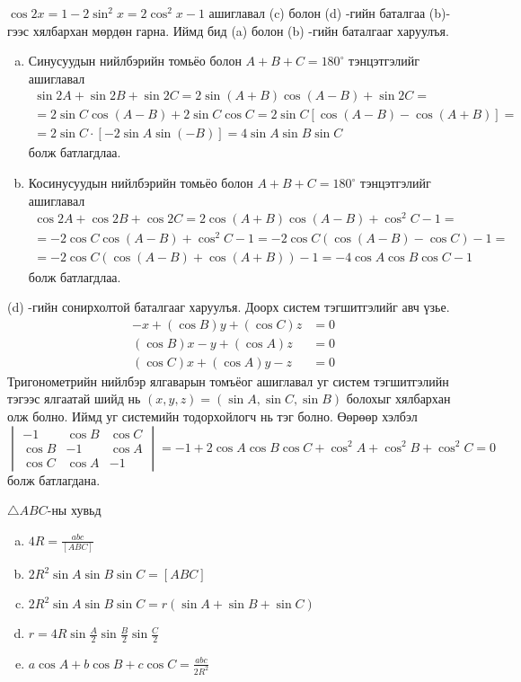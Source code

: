 \documentclass[10pt,a4paper,oneside]{book}
\begin{document}
\TheSolution
$\cos 2x = 1-2\sin^2 x = 2\cos^2 x - 1$ ашиглавал (c) болон  (d) -гийн баталгаа (b)-гээс хялбархан мөрдөн гарна. Иймд бид (a) болон (b) -гийн баталгааг харуулъя.
\begin{enumerate}[(a)]
\item
Синусуудын нийлбэрийн томьёо болон $A+B+C = 180^\circ$ тэнцэтгэлийг ашиглавал
\begin{align*}
\sin 2A + \sin 2B + \sin 2C = 2\sin (A+B)\cos(A-B) + \sin 2C = \\
= 2\sin C \cos(A-B) + 2\sin C \cos C = 2\sin C \left[\cos (A-B) - \cos (A+B)\right] = \\
= 2\sin C \cdot \left[-2\sin A \sin (-B)\right] = 4\sin A\sin B\sin C
\end{align*}
болж батлагдлаа.
\item
Косинусуудын нийлбэрийн томьёо болон $A+B+C = 180^\circ$  тэнцэтгэлийг ашиглавал
\begin{align*}
\cos 2A + \cos 2B + \cos 2C = 2\cos(A+B)\cos(A-B) + \cos^2 C -1 = \\
= -2\cos C \cos(A-B) + \cos^2 C - 1 = -2\cos C(\cos(A-B) - \cos C) - 1 =\\
= -2\cos C(\cos(A-B) + \cos(A+B)) - 1 = - 4\cos A \cos B\cos C -1
\end{align*}
болж батлагдлаа.
\end{enumerate}
\Note
(d) -гийн сонирхолтой баталгааг харуулъя. Доорх систем тэгшитгэлийг авч үзье.
\begin{align*}
-x + (\cos B)y +(\cos C)z &= 0\\
(\cos B)x -y + (\cos A)z &= 0\\
(\cos C) x + (\cos A) y - z &= 0
\end{align*}
Тригонометрийн нийлбэр ялгаварын томъёог ашиглавал уг систем тэгшитгэлийн тэгээс ялгаатай шийд нь $(x, y, z) = (\sin A, \sin C, \sin B)$ болохыг хялбархан олж болно. Иймд уг системийн тодорхойлогч нь тэг болно. Өөрөөр хэлбэл
\begin{equation*}
\begin{vmatrix}
-1 & \cos B & \cos C\\
\cos B & -1 & \cos A\\
\cos C & \cos A & -1
\end{vmatrix}
=-1+2\cos A\cos B \cos C + \cos^2 A + \cos^2 B + \cos^2 C = 0
\end{equation*}
болж батлагдана.


\Problem
$\triangle ABC$-ны хувьд
\begin{enumerate}[(a)]
\item
$4R = \frac{abc}{[ABC]}$
\item
$2R^2\sin A\sin B\sin C = [ABC]$
\item
$2R^2\sin A\sin B\sin C = r(\sin A + \sin B + \sin C)$
\item
$r=4R\sin \frac{A}{2}\sin \frac{B}{2} \sin \frac{C}{2}$
\item
$a\cos A + b\cos B + c\cos C = \frac{abc}{2R^2}$
\end{enumerate}
\end{document}
